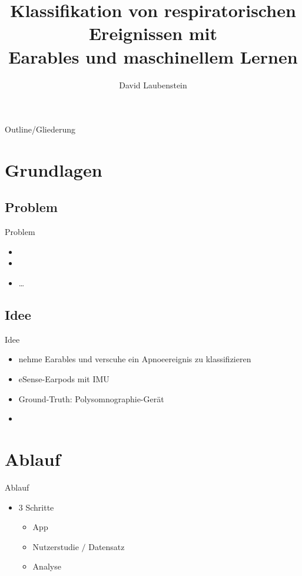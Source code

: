 \documentclass[18pt]{beamer}
\title[]{Klassifikation von respiratorischen Ereignissen mit \\ Earables und maschinellem Lernen}
\subtitle{}
\author{David Laubenstein}
\institute{Institut für Telematik: Pervasive Computing Systems / TECO}
\begin{document}

\begin{frame}
\titlepage
\end{frame}

\begin{frame}{Outline/Gliederung}
\tableofcontents
\end{frame}

\section{Grundlagen}
\subsection{Problem}
\begin{frame}{Problem}
\begin{itemize}
\item {}
\item {}
\item \dots
\end{itemize}
\end{frame}

\subsection{Idee}
\begin{frame}{Idee}
\begin{itemize}
\item nehme Earables und verscuhe ein Apnoeereignis zu klassifizieren
\item eSense-Earpods mit IMU
\item Ground-Truth: Polysomnographie-Gerät
\item {}
\end{itemize}
\end{frame}

\section{Ablauf}
\begin{frame}{Ablauf}
\begin{itemize}
    \item 3 Schritte
    \begin{itemize}
        \item App
        \item Nutzerstudie $/$ Datensatz
        \item Analyse
    \end{itemize}
\end{itemize}
\end{frame}
\end{document}
